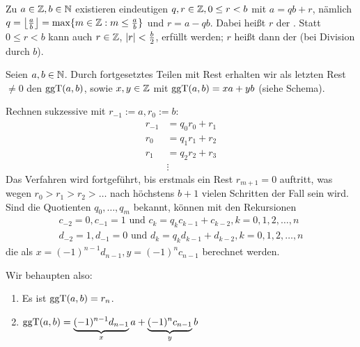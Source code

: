 \begin{satz}
	Zu $a \in \mathbb{Z}, b \in \mathbb{N}$ existieren eindeutigen $q,r \in \mathbb{Z}, 0 \leq r < b$ mit $a = qb + r$, nämlich $q = \floor*{\frac{a}{b}} = \max\{m \in \ZZ : \linebreak m \leq \frac{a}{b}\}$ und $r = a-qb$. 
	Dabei heißt $r$ der . 
	Statt $0 \leq r < b$ kann auch $r \in \mathbb{Z}$, $\lvert r\rvert < \frac{b}{2}$, erfüllt werden; $r$ heißt dann der  (bei Division durch $b$). 
	  
\end{satz}

\begin{satz}
\label{satz_ea}
	Seien $a,b \in \mathbb{N}$. 
	Durch fortgesetztes Teilen mit Rest erhalten wir als letzten Rest $\neq 0$ den $\operatorname{ggT}(a,b)$, sowie $x,y \in \mathbb{Z}$ mit $\operatorname{ggT}(a,b) = xa + yb$ (siehe Schema). 
\end{satz}

	Rechnen sukzessive mit $r_{-1} := a, r_0 :=b$:
	\begin{equation}
	\begin{aligned}
		r_{-1} &= q_0 r_0 + r_1 \\
		r_0 &= q_1 r_1 + r_2 \\
		r_1 &= q_2 r_2 + r_3 \\
		&\vdots
	\end{aligned}
	\end{equation}
	Das Verfahren wird fortgeführt, bis erstmals ein Rest $r_{m+1} = 0$ auftritt, was wegen $r_0 > r_1 > r_2 > \dots$ nach höchstens $b + 1$ vielen Schritten der Fall sein wird. 
	Sind die Quotienten $q_0, \dots, q_m$ bekannt, können mit den Rekursionen
	\[
	\begin{array}{c}
		c_{-2} = 0, c_{-1} = 1 \text{ und } c_k = q_k c_{k-1} + c_{k-2}, k=0,1,2, \dots, n \\
		d_{-2} = 1, d_{-1} = 0 \text{ und } d_k = q_k d_{k-1} + d_{k-2}, k=0,1,2, \dots, n
	\end{array}
	\]
	die  als $x = (-1)^{n-1} d_{n-1}, y=(-1)^n c_{n-1}$ berechnet werden.
	
	Wir behaupten also: \begin{enumerate}[(1)]
		\item Es ist $\operatorname{ggT}(a,b) = r_n$.
		\item $\operatorname{ggT}(a,b) = \underbrace{(-1)^{n-1} d_{n-1}}_{x} a + \underbrace{(-1)^n c_{n-1}}_{y} b$
	\end{enumerate}

